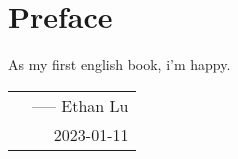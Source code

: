 \thispagestyle{empty}
\chapter*{Preface}
As my first english book, i'm happy.

\hfill
\begin{tabular}{lr}
    &----- Ethan Lu\\ 
    &2023-01-11
\end{tabular}

\let\cleardoublepage\clearpage